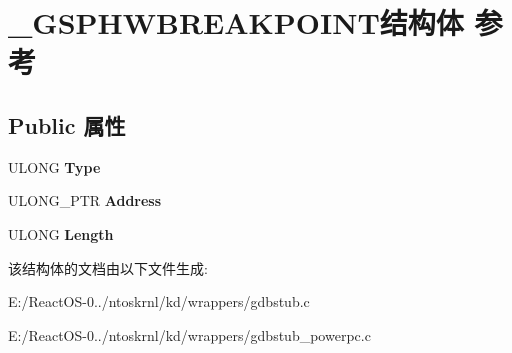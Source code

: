 \hypertarget{struct___g_s_p_h_w_b_r_e_a_k_p_o_i_n_t}{}\section{\+\_\+\+G\+S\+P\+H\+W\+B\+R\+E\+A\+K\+P\+O\+I\+N\+T结构体 参考}
\label{struct___g_s_p_h_w_b_r_e_a_k_p_o_i_n_t}
\subsection*{Public 属性}
\begin{DoxyCompactItemize}
\item 
\mbox{\label{struct___g_s_p_h_w_b_r_e_a_k_p_o_i_n_t_aae975308e5d8ed18f7f6dd79b7cfb058}} 
U\+L\+O\+NG {\bfseries Type}
\item 
\mbox{\label{struct___g_s_p_h_w_b_r_e_a_k_p_o_i_n_t_a8a14e39f3546c405c20bf3c520527f4b}} 
U\+L\+O\+N\+G\+\_\+\+P\+TR {\bfseries Address}
\item 
\mbox{\label{struct___g_s_p_h_w_b_r_e_a_k_p_o_i_n_t_ae1b2e097a5ef231657edd864731e9616}} 
U\+L\+O\+NG {\bfseries Length}
\end{DoxyCompactItemize}


该结构体的文档由以下文件生成\+:\begin{DoxyCompactItemize}
\item 
E\+:/\+React\+O\+S-\/0../ntoskrnl/kd/wrappers/gdbstub.\+c\item 
E\+:/\+React\+O\+S-\/0../ntoskrnl/kd/wrappers/gdbstub\+\_\+powerpc.\+c\end{DoxyCompactItemize}
